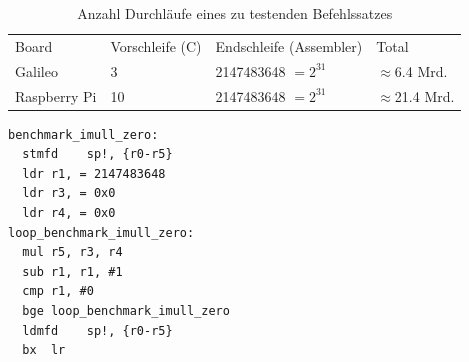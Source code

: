 \begin{table}[H]
\center
\begin{tabular}{ |l|l|l|l| }
\hline
Board & Vorschleife (C) & Endschleife (Assembler) & Total \\ \hhline{|=|=|=|=|}
Galileo & 3 & 2147483648 $=2^{31}$ & $\approx$6.4 Mrd.  \\ \hline
Raspberry Pi & 10 & 2147483648 $=2^{31}$ & $\approx$21.4 Mrd. \\ \hline
\end{tabular}
\caption{Anzahl Durchläufe eines zu testenden Befehlssatzes}
\label{tab:benchmark_loop_size}
\end{table}



\begin{minipage}{\linewidth}
\lstset{language=[x64]Assembler}
\begin{lstlisting}[label={list:asm_benchmark},caption={Benchmark in Assembler}]
benchmark_imull_zero:
  stmfd    sp!, {r0-r5}
  ldr r1, = 2147483648
  ldr r3, = 0x0
  ldr r4, = 0x0
loop_benchmark_imull_zero:
  mul r5, r3, r4
  sub r1, r1, #1
  cmp r1, #0
  bge loop_benchmark_imull_zero
  ldmfd    sp!, {r0-r5}
  bx  lr
\end{lstlisting}
\end{minipage}


